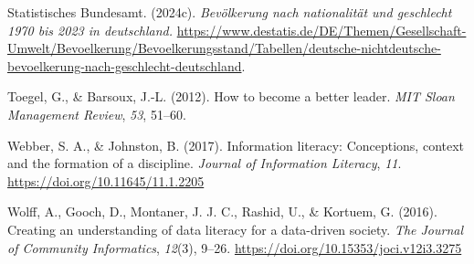 \documentclass[
  12pt,
  a4paper,
  twoside]{article}
\newlength{\cslhangindent}
\newenvironment{CSLReferences}[2] %
 {\begin{list}{}{%
  \setlength{\itemindent}{0pt}
  \setlength{\leftmargin}{0pt}
  \setlength{\parsep}{0pt}
  \ifodd #1
   \setlength{\leftmargin}{\cslhangindent}
   \setlength{\itemindent}{-1\cslhangindent}
  \fi
  \setlength{\itemsep}{#2\baselineskip}}}
 {\end{list}}
\begin{document}
\begin{CSLReferences}{1}{0}
Statistisches Bundesamt. (2024c). \emph{Bevölkerung nach nationalität und geschlecht 1970 bis 2023 in deutschland.} \url{https://www.destatis.de/DE/Themen/Gesellschaft-Umwelt/Bevoelkerung/Bevoelkerungsstand/Tabellen/deutsche-nichtdeutsche-bevoelkerung-nach-geschlecht-deutschland}.

Toegel, G., \& Barsoux, J.-L. (2012). How to become a better leader. \emph{MIT Sloan Management Review}, \emph{53}, 51--60.

Webber, S. A., \& Johnston, B. (2017). Information literacy: Conceptions, context and the formation of a discipline. \emph{Journal of Information Literacy}, \emph{11}. \url{https://doi.org/10.11645/11.1.2205}

Wolff, A., Gooch, D., Montaner, J. J. C., Rashid, U., \& Kortuem, G. (2016). Creating an understanding of data literacy for a data-driven society. \emph{The Journal of Community Informatics}, \emph{12}(3), 9--26. \url{https://doi.org/10.15353/joci.v12i3.3275}

\end{CSLReferences}
\end{document}
